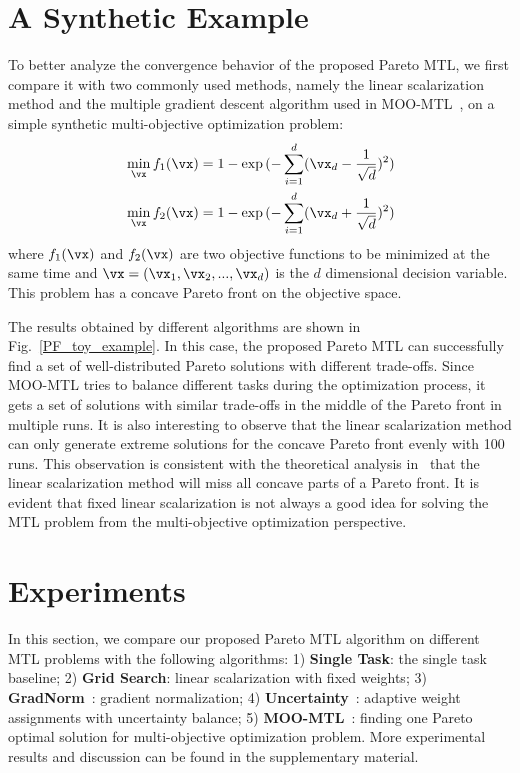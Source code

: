 \section{A Synthetic Example}

To better analyze the convergence behavior of the proposed Pareto MTL, we first compare it with two commonly used methods, namely the linear scalarization method and the multiple gradient descent algorithm used in MOO-MTL~\cite{sener2018multi}, on a simple synthetic multi-objective optimization problem:
\begin{eqnarray}
    \label{toy_example}
    \begin{aligned}
        &\min_{\vx} f_1(\vx) = 1 - \exp{(- \sum_{i=1}^{d} (\vx_d - \frac{1}{\sqrt{d}})^2)} \\
        &\min_{\vx} f_2(\vx) = 1 - \exp{(- \sum_{i=1}^{d} (\vx_d + \frac{1}{\sqrt{d}})^2)}
    \end{aligned}
\end{eqnarray}
where $f_1(\vx)$ and $f_2(\vx)$ are two objective functions to be minimized at the same time and $\vx = (\vx_1,\vx_2,...,\vx_d)$ is the $d$ dimensional decision variable. This problem has a concave Pareto front on the objective space.

The results obtained by different algorithms are shown in Fig.~\ref{PF_toy_example}. In this case, the proposed Pareto MTL can successfully find a set of well-distributed Pareto solutions with different trade-offs. Since MOO-MTL tries to balance different tasks during the optimization process, it gets a set of solutions with similar trade-offs in the middle of the Pareto front in multiple runs. It is also interesting to observe that the linear scalarization method can only generate extreme solutions for the concave Pareto front evenly with 100 runs. This observation is consistent with the theoretical analysis in~\cite{boyd2004convex} that the linear scalarization method will miss all concave parts of a Pareto front. It is evident that fixed linear scalarization is not always a good idea for solving the MTL problem from the multi-objective optimization perspective.

\section{Experiments}

In this section, we compare our proposed Pareto MTL algorithm on different MTL problems with the following algorithms: 1) \textbf{Single Task}: the single task baseline; 2) \textbf{Grid Search}: linear scalarization with fixed weights; 3) \textbf{GradNorm}~\cite{chen2018grad}:  gradient normalization; 4) \textbf{Uncertainty}~\cite{kendall2017multi}: adaptive weight assignments with uncertainty balance; 5) \textbf{MOO-MTL}~\cite{sener2018multi}: finding one Pareto optimal solution for multi-objective optimization problem. More experimental results and discussion can be found in the supplementary material.

